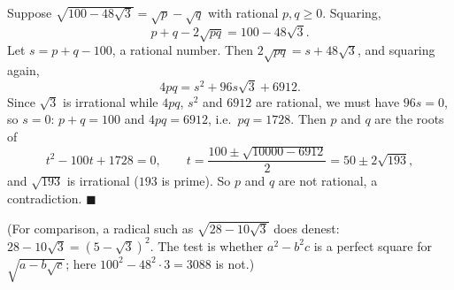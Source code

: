Suppose $\sqrt{100-48\sqrt3}=\sqrt p-\sqrt q$ with rational $p,q\ge0$. Squaring,
\[
p+q-2\sqrt{pq}=100-48\sqrt3 .
\]
Let $s=p+q-100$, a rational number. Then $2\sqrt{pq}=s+48\sqrt3$, and squaring again,
\[
4pq=s^2+96s\sqrt3+6912 .
\]
Since $\sqrt3$ is irrational while $4pq$, $s^2$ and $6912$ are rational, we must have $96s=0$, so $s=0$: $p+q=100$ and $4pq=6912$, i.e.\ $pq=1728$. Then $p$ and $q$ are the roots of
\[
t^2-100t+1728=0,\qquad t=\dfrac{100\pm\sqrt{10000-6912}}{2}=50\pm2\sqrt{193},
\]
and $\sqrt{193}$ is irrational ($193$ is prime). So $p$ and $q$ are not rational, a contradiction. $\blacksquare$

(For comparison, a radical such as $\sqrt{28-10\sqrt3}$ does denest: $28-10\sqrt3=(5-\sqrt3)^2$. The test is whether $a^2-b^2c$ is a perfect square for $\sqrt{a-b\sqrt c}$; here $100^2-48^2\cdot3=3088$ is not.)
